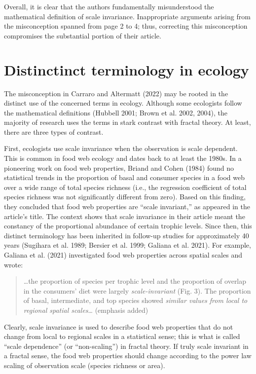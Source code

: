 \documentclass[
  12pt,
]{article}
\begin{document}
Overall, it is clear that the authors fundamentally misunderstood the mathematical definition of scale invariance. Inappropriate arguments arising from the misconception spanned from page 2 to 4; thus, correcting this misconception compromises the substantial portion of their article.

\hypertarget{distinctinct-terminology-in-ecology}{%
\section{Distinctinct terminology in ecology}\label{distinctinct-terminology-in-ecology}}

The misconception in Carraro and Altermatt (2022) may be rooted in the distinct use of the concerned terms in ecology. Although some ecologists follow the mathematical definitions (Hubbell 2001; Brown et al. 2002, 2004), the majority of research uses the terms in stark contrast with fractal theory. At least, there are three types of contrast.

First, ecologists use scale invariance when the observation is scale dependent. This is common in food web ecology and dates back to at least the 1980s. In a pioneering work on food web properties, Briand and Cohen (1984) found no statistical trends in the proportion of basal and consumer species in a food web over a wide range of total species richness (i.e., the regression coefficient of total species richness was not significantly different from zero). Based on this finding, they concluded that food web properties are ``scale invariant,'' as appeared in the article's title. The context shows that scale invariance in their article meant the constancy of the proportional abundance of certain trophic levels. Since then, this distinct terminology has been inherited in follow-up studies for approximately 40 years (Sugihara et al. 1989; Bersier et al. 1999; Galiana et al. 2021). For example, Galiana et al. (2021) investigated food web properties across spatial scales and wrote:

\begin{quote}
\ldots the proportion of species per trophic level and the proportion of overlap in the consumers' diet were largely \emph{scale-invariant} (Fig. 3). The proportion of basal, intermediate, and top species showed \emph{similar values from local to regional spatial scales}\ldots{} (emphasis added)
\end{quote}

Clearly, scale invariance is used to describe food web properties that do not change from local to regional scales in a statistical sense; this is what is called ``scale dependence'' (or ``non-scaling'') in fractal theory. If truly scale invariant in a fractal sense, the food web properties should change according to the power law scaling of observation scale (species richness or area).
\end{document}
